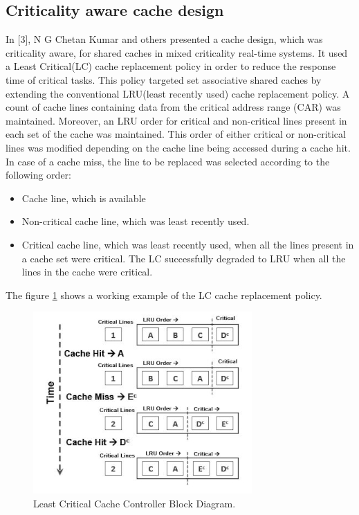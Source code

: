\documentclass[conference]{IEEEtran}
\begin{document}
\subsection{\textbf{Criticality aware cache design\cite{b4}}}

    In [3], N G Chetan Kumar and others presented a cache design, which was criticality aware, for shared caches in mixed criticality real-time systems. It used a Least Critical(LC) cache replacement policy in order to reduce the response time of critical tasks. This policy targeted set associative shared caches by extending the conventional LRU(least recently used) cache replacement policy. A count of cache lines containing data from the critical address range (CAR) was maintained. Moreover, an LRU order for critical and non-critical lines present in each set of the cache was maintained. This order of either critical or non-critical lines was modified depending on the cache line being accessed during a cache hit. In case of a cache miss, the line to be replaced was selected according to the following order:
    \begin{itemize}
        \item Cache line, which is available
        \item Non-critical cache line, which was least recently used. 
        \item Critical cache line, which was least recently used, when all the lines present in a cache set were critical. The LC successfully degraded to LRU when all the lines in the cache were critical.
    \end{itemize}
    The figure \ref{fig_d_1} shows a working example of the LC cache replacement policy.
    \begin{figure}[htbp]
        \centerline{\includegraphics{LCexample.jpg}}
        \caption{Least Critical Cache Controller Block Diagram.\cite{b4}}
        \label{fig_d_1}
    \end{figure}
\end{document}
